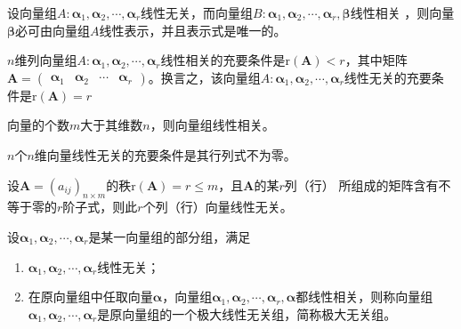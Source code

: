\begin{theorem}
    设向量组$A:\boldsymbol{\alpha}_1,\boldsymbol{\alpha}_2,\cdots,\boldsymbol{\alpha}_r$线性无关，而向量组$B:\boldsymbol{\alpha}_1,\boldsymbol{\alpha}_2,\cdots,\boldsymbol{\alpha}_r,\boldsymbol{\beta}$线性相关
    ，则向量$\boldsymbol{\beta}$必可由向量组$A$线性表示，并且表示式是唯一的。
\end{theorem}

\begin{theorem}
    $n$维列向量组$A:\boldsymbol{\alpha}_1,\boldsymbol{\alpha}_2,\cdots,\boldsymbol{\alpha}_r$线性相关的充要条件是$\mathrm{r}(\boldsymbol{A})<r$，其中矩阵
    $\boldsymbol{A}=\left(\begin{array}{cccc}
        \boldsymbol{\alpha}_1 & \boldsymbol{\alpha}_2 & \cdots & \boldsymbol{\alpha}_r 
    \end{array}\right)$。换言之，该向量组$A:\boldsymbol{\alpha}_1,\boldsymbol{\alpha}_2,\cdots,\boldsymbol{\alpha}_r$线性无关的充要条件是$\mathrm{r}(\boldsymbol{A})=r$
\end{theorem}

\begin{theorem}
    向量的个数$m$大于其维数$n$，则向量组线性相关。
\end{theorem}

\begin{theorem}
    $n$个$n$维向量线性无关的充要条件是其行列式不为零。
\end{theorem}

\begin{theorem}
    设$\boldsymbol{A}=(a_{ij})_{n\times m}$的秩$\mathrm{r}(\boldsymbol{A})=r\leq m$，且$\boldsymbol{A}$的某$r$列（行）
    所组成的矩阵含有不等于零的$r$阶子式，则此$r$个列（行）向量线性无关。
\end{theorem}

\begin{definition}[极大无关组]
    设$\boldsymbol{\alpha}_1,\boldsymbol{\alpha}_2,\cdots,\boldsymbol{\alpha}_r$是某一向量组的部分组，满足
    \begin{enumerate}[(1)]
        \item $\boldsymbol{\alpha}_1,\boldsymbol{\alpha}_2,\cdots,\boldsymbol{\alpha}_r$线性无关；
        \item 在原向量组中任取向量$\boldsymbol{\alpha}$，向量组$\boldsymbol{\alpha}_1,\boldsymbol{\alpha}_2,\cdots,\boldsymbol{\alpha}_r,\boldsymbol{\alpha}$都线性相关，则称向量组
        $\boldsymbol{\alpha}_1,\boldsymbol{\alpha}_2,\cdots,\boldsymbol{\alpha}_r$是原向量组的一个极大线性无关组，简称{\heiti 极大无关组}。
    \end{enumerate}
\end{definition}

